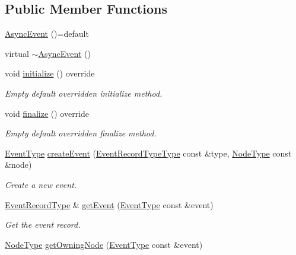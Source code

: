 \subsection*{Public Member Functions}
\begin{DoxyCompactItemize}
\item 
\hyperlink{structvt_1_1event_1_1_async_event_ad9837496e616789010bdbeefa968639d}{Async\+Event} ()=default
\item 
virtual \hyperlink{structvt_1_1event_1_1_async_event_a605a6078d0bcd10467a21464fe143561}{$\sim$\+Async\+Event} ()
\item 
void \hyperlink{structvt_1_1event_1_1_async_event_ac8d9f977b1cca3f43a06d0e83bc88e3d}{initialize} () override
\begin{DoxyCompactList}\small\item\em Empty default overridden initialize method. \end{DoxyCompactList}\item 
void \hyperlink{structvt_1_1event_1_1_async_event_a77e3aafaae98603825556cdf8105ba57}{finalize} () override
\begin{DoxyCompactList}\small\item\em Empty default overridden finalize method. \end{DoxyCompactList}\item 
\hyperlink{namespacevt_a009267401def7ae8bf201892222d060f}{Event\+Type} \hyperlink{structvt_1_1event_1_1_async_event_abc1629d13f9f3391e5e7f9ebc6303265}{create\+Event} (\hyperlink{namespacevt_1_1event_a1ea9fec44d101bf40b8fd786d44ebed9}{Event\+Record\+Type\+Type} const \&type, \hyperlink{namespacevt_a866da9d0efc19c0a1ce79e9e492f47e2}{Node\+Type} const \&node)
\begin{DoxyCompactList}\small\item\em Create a new event. \end{DoxyCompactList}\item 
\hyperlink{structvt_1_1event_1_1_async_event_a5b4ef37db6e5962fdc0e6e0e56e74bc1}{Event\+Record\+Type} \& \hyperlink{structvt_1_1event_1_1_async_event_a78e777586ef948a4436b8dcea3c33be4}{get\+Event} (\hyperlink{namespacevt_a009267401def7ae8bf201892222d060f}{Event\+Type} const \&event)
\begin{DoxyCompactList}\small\item\em Get the event record. \end{DoxyCompactList}\item 
\hyperlink{namespacevt_a866da9d0efc19c0a1ce79e9e492f47e2}{Node\+Type} \hyperlink{structvt_1_1event_1_1_async_event_a288c3db66bf12de8dc65733b184870c0}{get\+Owning\+Node} (\hyperlink{namespacevt_a009267401def7ae8bf201892222d060f}{Event\+Type} const \&event)

\end{DoxyCompactItemize}
